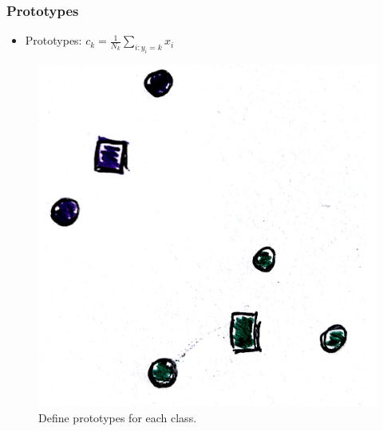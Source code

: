 \documentclass[10pt,mathserif]{beamer}
\begin{document}
\begin{frame}
  \frametitle{Prototypes}
 \begin{itemize}
 \item Prototypes: $c_k = \frac{1}{N_k} \sum_{i : y_i = k} x_i$
 \end{itemize} 
\begin{figure}[ht]
  \centering
  \includegraphics[width=0.35\paperwidth]{figure/prototypes_2}
  \caption{Define prototypes for each class.\label{fig:prototypes_2} }
\end{figure}
\end{frame}
\end{document}
